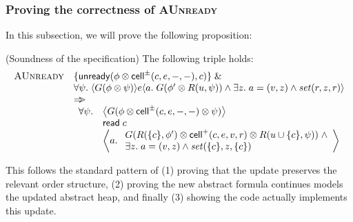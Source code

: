 \subsubsection{Proving the correctness of \textsc{AUnready}}

In this subsection, we will prove the following proposition:

\begin{prop*}{(Soundness of the  specification)}
The following triple holds:
\begin{displaymath}
\begin{array}{ll}
\mbox{\textsc{AUnready}} & 
  \{{\mathsf{unready}({\phi \otimes \mathsf{cell}^{\pm}({c}, {e}, {-}, {-})}, {c})}\} \;\&\; \\
& \forall \psi.\; \langle{G(\phi \otimes \psi)}\rangle{e}\langle{a}.\;{G(\phi' \otimes R(u, \psi)) \land \exists z.\; a = (v, z) \land \mathit{set}(r, z, r)}\rangle \\
& \Rightarrow\!\!\!> \\
& \begin{array}{ll}
   \forall \psi. & \left<G(\phi \otimes \mathsf{cell}^{\pm}({c}, {e}, {-}, {-}) \otimes \psi)\right> \\
                 & \mathsf{read}\; c \\
                 & \left<a.\; 
                     \begin{array}{l}
                       G(R(\{{c}\}, \phi') \otimes \mathsf{cell}^{+}({c}, {e}, {v}, {r}) \otimes R(u \cup \{{c}\}, \psi)) 
                        \;\land \\
                        \exists z.\;a = (v, z) \land \mathit{set}(\{{c}\}, z, \{{c}\})
                     \end{array}\right> 
  \end{array}
\end{array}
\end{displaymath}
\end{prop*}

This follows the standard pattern of (1) proving that the update
preserves the relevant order structure, (2) proving the new abstract
formula continues models the updated abstract heap, and finally (3)
showing the code actually implements this update. 


